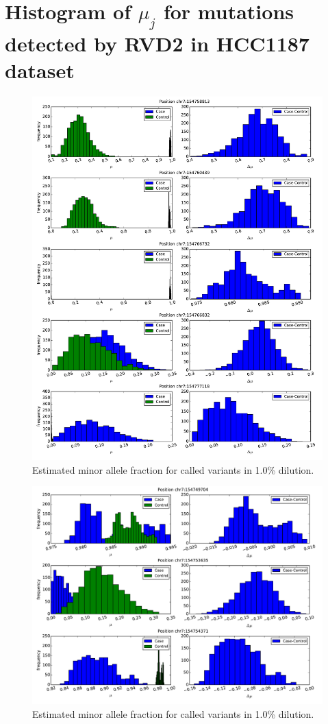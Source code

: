 \documentclass[11pt,reqno]{amsart}
\begin{document}
\section{Histogram of $ \mu_j $ for mutations detected by RVD2 in HCC1187 dataset}
\begin{figure}[H]
\begin{center}
\includegraphics[width=120mm]{pdf_figs/HCC1187_histogram_pos.pdf}
\caption{Estimated minor allele fraction for called variants in 1.0\% dilution.}
\label{fig:hist_pos}
\end{center}
\end{figure}

\begin{figure}[H]
\begin{center}
\includegraphics[width=120mm]{pdf_figs/HCC1187_histogram_neg.pdf}
\caption{Estimated minor allele fraction for called variants in 1.0\% dilution.}
\label{fig:hist_neg}
\end{center}
\end{figure}
\end{document}
